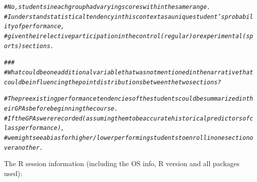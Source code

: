 \documentclass{article}\usepackage[]{graphicx}\usepackage[]{xcolor}
\makeatletter
\newcommand{\hlcom}[1]{\textcolor[rgb]{0.678,0.584,0.686}{\textit{#1}}}%
\newenvironment{kframe}{%
 \def\at@end@of@kframe{}%
 \ifinner\ifhmode%
  \def\at@end@of@kframe{\end{minipage}}%
  \begin{minipage}{\columnwidth}%
 \fi\fi%
 \def\FrameCommand##1{\hskip\@totalleftmargin \hskip-\fboxsep
 \colorbox{shadecolor}{##1}\hskip-\fboxsep
     \hskip-\linewidth \hskip-\@totalleftmargin \hskip\columnwidth}%
 \MakeFramed {\advance\hsize-\width
   \@totalleftmargin\z@ \linewidth\hsize
   \@setminipage}}%
 {\par\unskip\endMakeFramed%
 \at@end@of@kframe}
\newenvironment{knitrout}{}{} %
\makeatother
\begin{document}
\begin{knitrout}
\begin{kframe}
\begin{alltt}
  \hlcom{# No, students in each group had varying scores within the same range.}
  \hlcom{# I understand statistical tendency in this context as a unique student's probability of performance,}
  \hlcom{# given their elective participation in the control (regular) or experimental (sports) sections.}

\hlcom{###}
\hlcom{# What could be one additional variable that was not mentioned in the narrative that could be influencing the point distributions between the two sections?}

  \hlcom{# The preexisting performance tendencies of the students could be summarized in their GPAs before beginning the course.}
  \hlcom{# If the GPAs were recorded (assuming them to be accurate historical predictors of class performance),}
  \hlcom{# we might see a bias for higher/lower performing students to enroll in one section over another.}
\end{alltt}
\end{kframe}
\end{knitrout}

The R session information (including the OS info, R version and all
packages used):
\end{document}
